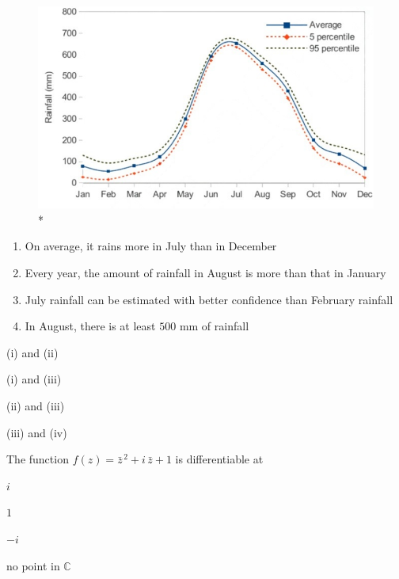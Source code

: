 \documentclass[journal,12pt,onecolumn]{IEEEtran}
\theoremstyle{remark}
\begin{document}
\begin{enumerate}
{\begin{figure}[h!]
\centering
\includegraphics[width=.85\linewidth]{figs/FIG1.png}
\caption{*}
\end{figure}

\begin{enumerate}
\item On average, it rains more in July than in December
\item Every year, the amount of rainfall in August is more than that in January
\item July rainfall can be estimated with better confidence than February rainfall
\item In August, there is at least $500$ mm of rainfall
\end{enumerate}

\begin{enumerate}
\begin{multicols}{2}
\item (i) and (ii)
\item (i) and (iii)
\item (ii) and (iii)
\item (iii) and (iv)
\end{multicols}
\end{enumerate}


\item The function $f(z)=\bar z^{\,2}+i\,\bar z+1$ is differentiable at

\hfill{}

\begin{enumerate}
\begin{multicols}{4}
\item $i$
\item $1$
\item $-i$
\item no point in $\mathbb{C}$
\end{multicols}
\end{enumerate}


}
\end{enumerate}
\end{document}
